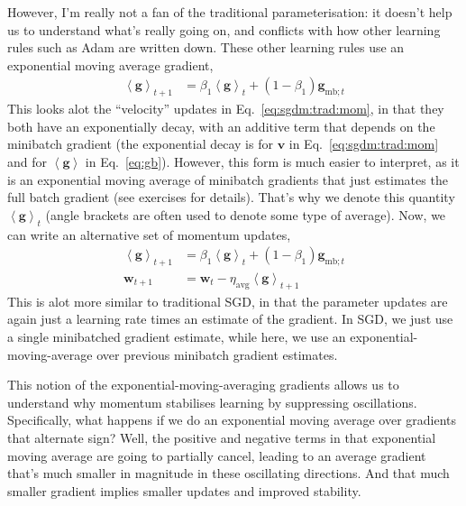 \documentclass{article}
\newcommand{\bracket}[3]{\left#1 #3 \right#2}
\newcommand{\sqb}{\bracket{[}{]}}
\newcommand{\ab}{\bracket{\langle}{\rangle}}
\newcommand{\0}{\mathbf{0}}
\newcommand{\g}{\mathbf{g}}
\newcommand{\mom}{\mathbf{v}}
\newcommand{\gfb}{\g_\text{fb}}
\newcommand{\gmbt}{\g_{\text{mb}; t}}
\newcommand{\gb}{\mathbf{\ab{g}}}
\newcommand{\w}{\mathbf{w}}
\newcommand{\E}{\operatorname{E}\sqb}
\newcommand{\lravg}{\eta_\text{avg}}
\begin{document}
However, I'm really not a fan of the traditional parameterisation: it doesn't help us to understand what's really going on, and conflicts with how other learning rules such as Adam are written down.
These other learning rules use an exponential moving average gradient,
\begin{align}
  \label{eq:gb}
  \gb_{t+1} &= \beta_1 \gb_{t} + (1-\beta_1) \gmbt
\end{align}
This looks alot the ``velocity'' updates in Eq.~\eqref{eq:sgdm:trad:mom}, in that they both have an exponentially decay, with an additive term that depends on the minibatch gradient (the exponential decay is for $\mom$ in Eq.~\eqref{eq:sgdm:trad:mom} and for $\gb$ in Eq.~\eqref{eq:gb}).
However, this form is much easier to interpret, as it is an exponential moving average of minibatch gradients that just estimates the full batch gradient (see exercises for details).
That's why we denote this quantity $\gb_t$ (angle brackets are often used to denote some type of average).
Now, we can write an alternative set of momentum updates,
\begin{subequations}
\begin{align}
  \label{eq:sgdm:avg:g}
  \gb_{t+1} &= \beta_1 \gb_t + (1-\beta_1) \gmbt\\
  \label{eq:sgdm:avg:w}
  \w_{t+1} &= \w_{t} - \lravg \gb_{t+1}
\end{align}
\end{subequations}
This is alot more similar to traditional SGD, in that the parameter updates are again just a learning rate times an estimate of the gradient.
In SGD, we just use a single minibatched gradient estimate, while here, we use an exponential-moving-average over previous minibatch gradient estimates.

This notion of the exponential-moving-averaging gradients allows us to understand why momentum stabilises learning by suppressing oscillations.
Specifically, what happens if we do an exponential moving average over gradients that alternate sign?
Well, the positive and negative terms in that exponential moving average are going to partially cancel, leading to an average gradient that's much smaller in magnitude in these oscillating directions.
And that much smaller gradient implies smaller updates and improved stability.
\end{document}
